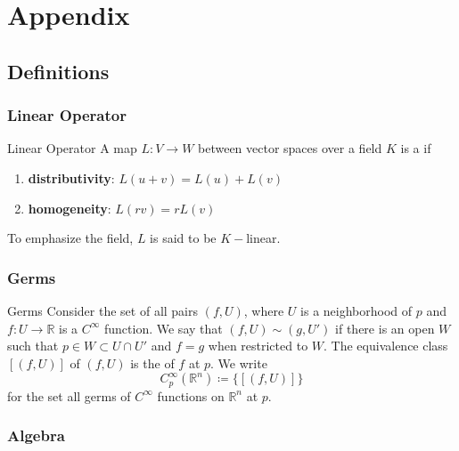 \section{Appendix}\label{sec:appendix}
\localtableofcontents

\subsection{Definitions}

\subsubsection{Linear Operator}\label{subsubsec:linearoperator}

\begin{definition}{Linear Operator}{}
    A map \(L \colon V \rightarrow W\) between vector spaces over a field \(K\) is a  if
    \begin{enumerate}
        \item \textbf{distributivity}: \(L(u+v) = L(u) + L(v)\)
        \item \textbf{homogeneity}: \(L(rv) = r L(v)\)
    \end{enumerate}
    To emphasize the field, \(L\) is said to be \(K-\)linear.
\end{definition}


\subsubsection{Germs}

\begin{definition}{Germs}{}
    Consider the set of all pairs \((f, U)\), where \(U\) is a neighborhood of \(p\) and \(f\colon U \rightarrow \mathbb{R}\) is a \(C^\infty\) function.
    We say that \((f, U) \sim (g, U')\) if there is an open \(W\) such that \(p \in W \subset U \cap U'\) and \(f = g\) when restricted to \(W\).
    The equivalence class \([(f, U)]\) of \((f, U)\) is the  of \(f\) at \(p\).
    We write
    \begin{equation}
        C_p^\infty(\mathbb{R}^n) \coloneqq \{[(f, U)]\}
    \end{equation}
    for the set all germs of \(C^\infty\) functions on \(\mathbb{R}^n\) at \(p\).
\end{definition}

\subsubsection{Algebra}\label{subsubsec:algebra}

